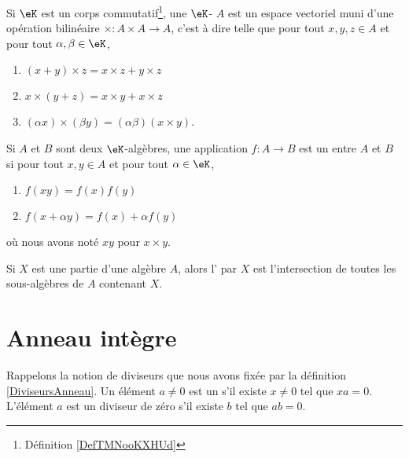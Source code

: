 \begin{definition}   \label{DefAEbnJqI}
    Si \( \eK\) est un corps commutatif\footnote{Définition \ref{DefTMNooKXHUd}}, une \( \eK\)- \( A\) est un espace vectoriel muni d'une opération bilinéaire \( \times\colon A\times A\to A\), c'est à dire telle que pour tout \( x,y,z\in A\) et pour tout \( \alpha,\beta\in\eK\),
    \begin{enumerate}
        \item
            \( (x+y)\times z=x\times z+y\times z\)
        \item
            \( x\times (y+z)=x\times y+x\times z\)
        \item
            \( (\alpha x)\times (\beta y)=(\alpha\beta)(x\times y)\).
    \end{enumerate}
    Si \( A\) et \( B\) sont deux \( \eK\)-algèbres, une application \( f\colon A\to B\) est un  entre \( A\) et \( B\) si pour tout \( x,y\in A\) et pour tout \( \alpha\in \eK\),
    \begin{enumerate}
        \item
            \( f(xy)=f(x)f(y)\)
        \item
            \( f(x+\alpha y)=f(x)+\alpha f(y)\)
    \end{enumerate}
    où nous avons noté \( xy\) pour \( x\times y\).
\end{definition}

\begin{definition}  \label{DefkAXaWY}
    Si \( X\) est une partie d'une algèbre \( A\), alors l' par \( X\) est l'intersection de toutes les sous-algèbres de \( A\) contenant \( X\).
\end{definition}

\section{Anneau intègre}
\label{SECAnneauxIntegres}

Rappelons la notion de diviseurs que nous avons fixée par la définition \ref{DiviseursAnneau}.
Un élément \( a\neq 0\) est un  s'il existe \( x\neq 0\) tel que $xa=0$. L'élément \( a\) est un diviseur de zéro  s'il existe \( b\) tel que \( ab=0\).

